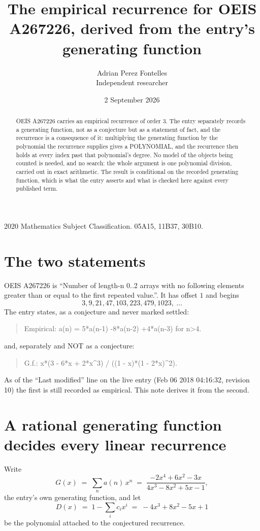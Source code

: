 \documentclass[11pt,a4paper]{article}
\title{The empirical recurrence for OEIS A267226, derived from the entry's generating function}
\author{Adrian Perez Fontelles\\ \small Independent researcher}
\date{2 September 2026}
\theoremstyle{plain}
\theoremstyle{definition}
\begin{document}
\maketitle

\begin{abstract}
OEIS A267226 carries an empirical recurrence of order $3$. The entry separately records a
generating function, not as a conjecture but as a statement of fact, and the recurrence is a
consequence of it: multiplying the generating function by the polynomial the recurrence
supplies gives a POLYNOMIAL, and the recurrence then holds at every index past that
polynomial's degree. No model of the objects being counted is needed, and no search: the
whole argument is one polynomial division, carried out in exact arithmetic. The result is
conditional on the recorded generating function, which is what the entry asserts and what is
checked here against every published term.
\end{abstract}

\noindent\small 2020 Mathematics Subject Classification. 05A15, 11B37, 30B10.\normalsize

\section{The two statements}

OEIS A267226 is ``Number of length-n 0..2 arrays with no following elements greater than or equal to the first repeated value.''. It has offset $1$ and begins
\[
3, 9, 21, 47, 103, 223, 479, 1023,\ \dots
\]
The entry states, as a conjecture and never marked settled:
\begin{quote}
Empirical: a(n) = 5*a(n-1) -8*a(n-2) +4*a(n-3) for n>4.
\end{quote}
and, separately and NOT as a conjecture:
\begin{quote}
G.f.: x*(3 - 6*x + 2*x\^{}3) / ((1 - x)*(1 - 2*x)\^{}2).
\end{quote}
As of the ``Last modified'' line on the live entry (Feb 06 2018 04:16:32, revision 10) the first is still
recorded as empirical. This note derives it from the second.

\section{A rational generating function decides every linear recurrence}

Write
\[
G(x)\;=\;\sum_{n}a(n)\,x^{n}\;=\;\frac{- 2 x^{4} + 6 x^{2} - 3 x}{4 x^{3} - 8 x^{2} + 5 x - 1},
\]
the entry's own generating function, and let
\[
D(x)\;=\;1-\sum_i c_i x^{i}\;=\;- 4 x^{3} + 8 x^{2} - 5 x + 1
\]
be the polynomial attached to the conjectured recurrence.
\end{document}
